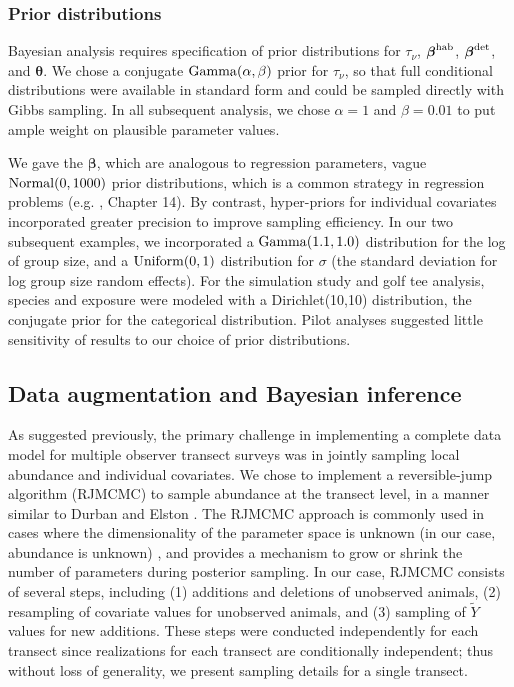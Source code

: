 \documentclass[10pt]{article}
\begin{document}
\subsubsection*{Prior distributions}

Bayesian analysis requires specification of prior distributions for $\tau_\nu$, $\boldsymbol{\beta}^{\rm hab}$, $\boldsymbol{\beta}^{\rm det}$, and $\boldsymbol{\theta}$.  We chose a conjugate ${\rm Gamma}(\alpha,\beta)$ prior for $\tau_\nu$, so that full conditional distributions were available in standard form and could be sampled directly with Gibbs sampling. In all subsequent analysis, we chose $\alpha=1$ and $\beta=0.01$ to put ample weight on plausible parameter values.

We gave the $\boldsymbol{\beta}$, which are analogous to regression parameters, vague ${\rm Normal}(0,1000)$ prior distributions, which is a common strategy in regression problems (e.g. \cite{GelmanEtAl2004}, Chapter 14).  By contrast, hyper-priors for individual covariates incorporated greater precision to improve sampling efficiency.  In our two subsequent examples, we incorporated a ${\rm Gamma}(1.1,1.0)$ distribution for the log of group size, and a ${\rm Uniform}(0,1)$ distribution for $\sigma$ (the standard deviation for log group size random effects). For the simulation study and golf tee analysis, species and exposure were modeled with a Dirichlet(10,10) distribution, the conjugate prior for the categorical distribution.  Pilot analyses suggested little sensitivity of results to our choice of prior distributions.

\subsection*{Data augmentation and Bayesian inference}

As suggested previously, the primary challenge in implementing a complete data model for multiple observer transect surveys was in jointly sampling local abundance and individual covariates.  We chose to implement a reversible-jump algorithm (RJMCMC) to sample abundance at the transect level, in a manner similar to Durban and Elston \cite{DurbanElston2005}. The RJMCMC approach is commonly used in cases where the dimensionality of the parameter space is unknown (in our case, abundance is unknown) \cite{Green1995}, and provides a mechanism to grow or shrink the number of parameters during posterior sampling. In our case, RJMCMC consists of several steps, including (1) additions and deletions of unobserved animals, (2) resampling of covariate values for unobserved animals, and (3) sampling of $\tilde{Y}$ values for new additions. These steps were conducted independently for each transect since realizations for each transect are conditionally independent; thus without loss of generality, we present sampling details for a single transect.
\end{document}
